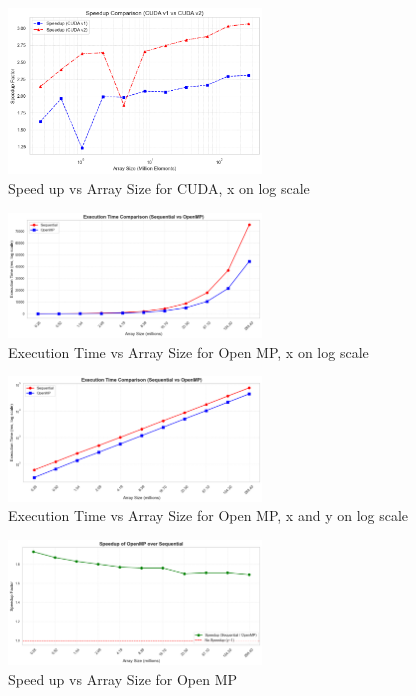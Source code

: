 \documentclass{article}
\begin{document}
\begin{figure}[h]
  \centering
  \includegraphics[width=0.6\textwidth]{Images/plot4.png}
  \caption{Speed up vs Array Size for CUDA, x on log scale}
\end{figure}

\begin{figure}[h]
  \centering
  \includegraphics[width=0.6\textwidth]{Images/plot5_xlog.png}
  \caption{Execution Time vs Array Size for Open MP, x on log scale}
\end{figure}

\begin{figure}[h]
  \centering
  \includegraphics[width=0.6\textwidth]{Images/plot5_xylog.png}
  \caption{Execution Time vs Array Size for Open MP, x and y on log scale}
\end{figure}

\begin{figure}[h]
  \centering
  \includegraphics[width=0.6\textwidth]{Images/speedupOpenMP.png}
  \caption{Speed up vs Array Size for Open MP}
\end{figure}
\end{document}
